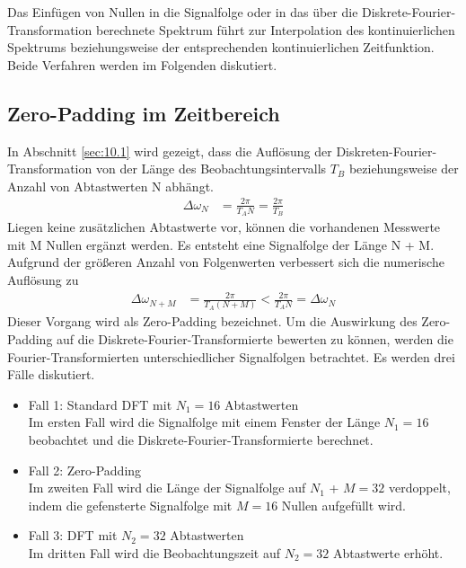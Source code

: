 Das Einfügen von Nullen in die Signalfolge oder in das über die Diskrete-Fourier-Transformation berechnete Spektrum führt zur Interpolation des kontinuierlichen Spektrums beziehungsweise der entsprechenden kontinuierlichen Zeitfunktion. Beide Verfahren werden im Folgenden diskutiert.

\subsection{Zero-Padding im Zeitbereich}\label{sec:zero-padding-im-zeitbereich}

In Abschnitt \ref{sec:10.1} wird gezeigt, dass die Auflösung der Diskreten-Fourier-Transformation von der Länge des Beobachtungsintervalls \(T_{B}\) beziehungsweise der Anzahl von Abtastwerten N abhängt.
\begin{align}
\Delta\omega_{N} &= \frac{2  \pi}{T_{A}  N} = \frac{2  \pi}{T_{B}} \label{eq:10.75}
\end{align}
Liegen keine zusätzlichen Abtastwerte vor, können die vorhandenen Messwerte mit M Nullen ergänzt werden. Es entsteht eine Signalfolge der Länge N + M. Aufgrund der größeren Anzahl von Folgenwerten verbessert sich die numerische Auflösung zu
\begin{align}
\Delta\omega_{N + M} &= \frac{2  \pi}{T_{A}  (N + M)} < \frac{2  \pi}{T_{A}  N} = \Delta\omega_{N} \label{eq:10.76}
\end{align}
Dieser Vorgang wird als Zero-Padding bezeichnet. Um die Auswirkung des Zero-Padding auf die Diskrete-Fourier-Transformierte bewerten zu können, werden die Fourier-Transformierten unterschiedlicher Signalfolgen betrachtet. Es werden drei Fälle diskutiert.

\begin{itemize}
\item
  Fall 1: Standard DFT mit \(N_{1} = 16\) Abtastwerten\\
  Im ersten Fall wird die Signalfolge mit einem Fenster der Länge \(N_{1} = 16\) beobachtet und die Diskrete-Fourier-Transformierte berechnet.
\item
  Fall 2: Zero-Padding\\
  Im zweiten Fall wird die Länge der Signalfolge auf \(N_{1}\) + \(M = 32\) verdoppelt, indem die gefensterte Signalfolge mit \(M = 16\) Nullen aufgefüllt wird.
\item
  Fall 3: DFT mit \(N_{2} = 32\) Abtastwerten\\
  Im dritten Fall wird die Beobachtungszeit auf \(N_{2} = 32\) Abtastwerte erhöht.
\end{itemize}

